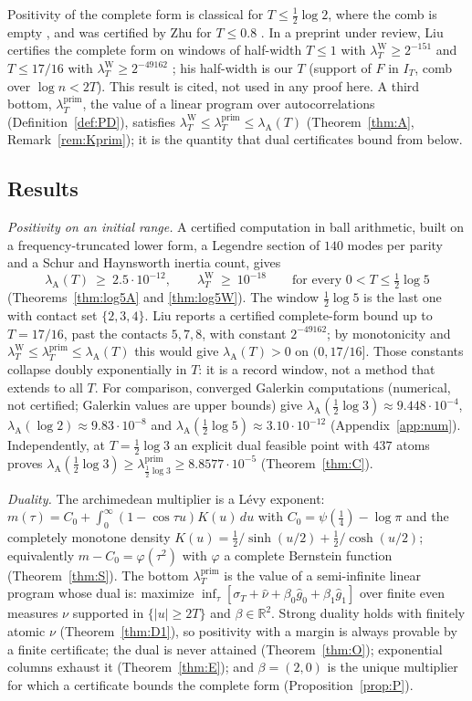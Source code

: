 \documentclass[11pt]{amsart}
\theoremstyle{definition}
\theoremstyle{remark}
\newcommand{\R}{\mathbb R}
\newcommand{\IT}{I_T}
\newcommand{\lamP}{\lambda^{\mathrm{prim}}_T}
\newcommand{\lamW}{\lambda^{\mathrm W}_T}
\newcommand{\lamA}{\lambda_{\mathrm A}(T)}
\newcommand{\sT}{\sigma_T}
\newcommand{\gh}[1]{\widehat g_{#1}}
\newcommand{\nuh}{\widehat\nu}
\begin{document}
Positivity of the complete form is classical for $T\le\frac12\log2$, where the comb is empty
\cite{Yoshida1992,Bombieri2000}, and was certified by Zhu for $T\le0.8$ \cite[Thm.~1.2]{Zhu2026}. In a preprint under review, Liu certifies the
complete form on windows of half-width $T\le1$ with $\lamW\ge2^{-151}$ and $T\le17/16$ with
$\lamW\ge2^{-49162}$ \cite[Thms.~A, B]{Liu2026}; his half-width is our $T$ (support of $F$ in $\IT$, comb
over $\log n<2T$). This result is cited, not used in any proof here. A
third bottom, $\lamP$, the value of a linear program over autocorrelations (Definition~\ref{def:PD}),
satisfies $\lamW\le\lamP\le\lamA$ (Theorem~\ref{thm:A}, Remark~\ref{rem:Kprim}); it is the quantity
that dual certificates bound from below.

\subsection{Results}
\emph{Positivity on an initial range.} A certified computation in ball arithmetic, built on a
frequency-truncated lower form, a Legendre section of $140$ modes per parity and a Schur and Haynsworth
inertia count, gives
\[
\lamA\ \ge\ 2.5\cdot10^{-12},\qquad \lamW\ \ge\ 10^{-18}\qquad\text{for every }0<T\le\tfrac12\log5
\]
(Theorems~\ref{thm:log5A} and \ref{thm:log5W}). The window $\frac12\log5$ is the last one with contact
set $\{2,3,4\}$. Liu \cite{Liu2026} reports a certified complete-form bound up to $T=17/16$, past the
contacts $5,7,8$, with constant $2^{-49162}$; by monotonicity and $\lamW\le\lamP\le\lamA$ this would
give $\lamA>0$ on $(0,17/16]$. Those constants collapse doubly exponentially in $T$: it is a record window,
not a method that extends to all $T$. For comparison, converged Galerkin computations (numerical, not certified; Galerkin
values are upper bounds) give $\lambda_{\mathrm A}(\frac12\log3)\approx9.448\cdot10^{-4}$,
$\lambda_{\mathrm A}(\log2)\approx9.83\cdot10^{-8}$ and $\lambda_{\mathrm A}(\frac12\log5)\approx3.10\cdot10^{-12}$
(Appendix~\ref{app:num}). Independently, at $T=\frac12\log3$ an explicit dual feasible point with $437$
atoms proves $\lambda_{\mathrm A}(\frac12\log3)\ge\lambda^{\mathrm{prim}}_{\frac12\log3}\ge8.8577\cdot10^{-5}$
(Theorem~\ref{thm:C}).

\emph{Duality.} The archimedean multiplier is a L\'evy exponent:
$m(\tau)=C_0+\int_0^\infty(1-\cos\tau u)K(u)\,du$ with $C_0=\psi(\frac14)-\log\pi$ and the completely
monotone density $K(u)=\frac12/\sinh(u/2)+\frac12/\cosh(u/2)$; equivalently $m-C_0=\varphi(\tau^2)$ with
$\varphi$ a complete Bernstein function (Theorem~\ref{thm:S}). The bottom $\lamP$ is the value of a
semi-infinite linear program whose dual is: maximize $\inf_\tau[\sT+\nuh+\beta_0\gh0+\beta_1\gh1]$ over
finite even measures $\nu$ supported in $\{|u|\ge2T\}$ and $\beta\in\R^2$. Strong duality holds with
finitely atomic $\nu$ (Theorem~\ref{thm:D1}), so positivity with a margin is always provable by a finite
certificate; the dual is never attained (Theorem~\ref{thm:O}); exponential columns exhaust it
(Theorem~\ref{thm:E}); and $\beta=(2,0)$ is the unique multiplier for which a certificate bounds the
complete form (Proposition~\ref{prop:P}).
\end{document}
